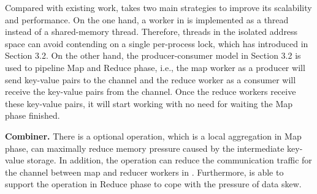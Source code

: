 Compared with existing work, \myds takes two main strategies to improve its scalability and performance.
On the one hand, a worker in \myds is implemented as a \myth thread instead of a shared-memory thread.
Therefore, threads in the isolated address space can avoid contending on a single per-process lock, which has introduced in Section 3.2.
On the other hand, the producer-consumer model in Section 3.2 is used to pipeline Map and Reduce phase,
i.e., the map worker as a producer will send key-value pairs to the channel and the reduce worker as a consumer will receive the key-value pairs from the channel. 
Once the reduce workers receive these key-value pairs, it will start working with no need for waiting the Map phase finished.


%
{\bf Combiner.}
There is a optional  operation, which is a local aggregation in Map phase, can maximally reduce memory pressure caused by the intermediate key-value storage.
In addition, the  operation can reduce the communication traffic for the channel between map and reducer workers in \myds.
Furthermore, \myds is able to support the  operation in Reduce phase to cope with the pressure of data skew. 

